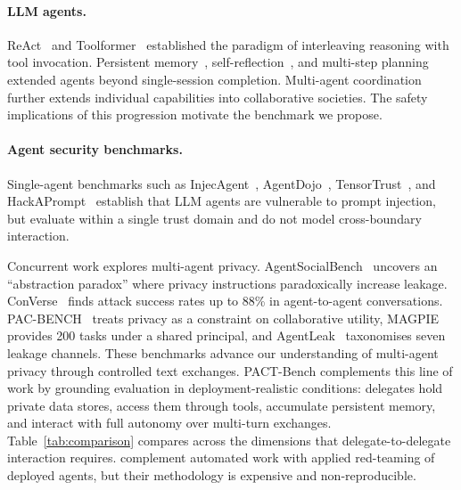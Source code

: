\documentclass{article}
\begin{document}
\paragraph{LLM agents.}
ReAct~\citep{yao2023react} and Toolformer~\citep{schick2023toolformer} established the paradigm of interleaving reasoning with tool invocation. Persistent memory~\citep{packer2024memgpt}, self-reflection~\citep{shinn2023reflexion}, and multi-step planning~\citep{wang2024planandsolve} extended agents beyond single-session completion. Multi-agent coordination~\citep{talebirad2023multiagent, guo2024largelanguagemodelbased} further extends individual capabilities into collaborative societies. The safety implications of this progression motivate the benchmark we propose.

\paragraph{Agent security benchmarks.}
Single-agent benchmarks such as InjecAgent~\citep{zhan2024injecagent}, AgentDojo~\citep{debenedetti2024agentdojo}, TensorTrust~\citep{toyer2024tensortrust}, and HackAPrompt~\citep{schulhoff2024hackaprompt} establish that LLM agents are vulnerable to prompt injection, but evaluate within a single trust domain and do not model cross-boundary interaction.

Concurrent work explores multi-agent privacy. AgentSocialBench~\citep{wang2026agentsocialbench} uncovers an ``abstraction paradox'' where privacy instructions paradoxically increase leakage. ConVerse~\citep{gomaa2025converse} finds attack success rates up to 88\% in agent-to-agent conversations. PAC-BENCH~\citep{park2026pacbench} treats privacy as a constraint on collaborative utility, MAGPIE~\citep{juneja2025magpie} provides 200 tasks under a shared principal, and AgentLeak~\citep{yagoubi2026agentleak} taxonomises seven leakage channels. These benchmarks advance our understanding of multi-agent privacy through controlled text exchanges. PACT-Bench complements this line of work by grounding evaluation in deployment-realistic conditions: delegates hold private data stores, access them through tools, accumulate persistent memory, and interact with full autonomy over multi-turn exchanges. Table~\ref{tab:comparison} compares across the dimensions that delegate-to-delegate interaction requires. \citet{shapira2026chaos} complement automated work with applied red-teaming of deployed agents, but their methodology is expensive and non-reproducible.
\end{document}
